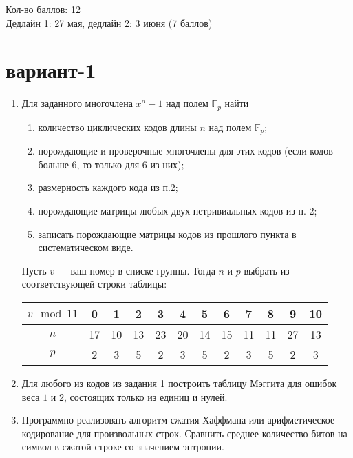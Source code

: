 \documentclass[12pt,letterpaper]{article}
\newcommand{\FF}{\mathds{F}}
\begin{document}
Кол-во баллов: 12\\
Дедлайн 1: 27 мая, дедлайн 2: 3 июня (7 баллов)

\section*{вариант-1}
\begin{enumerate}[\bfseries 1.]
  \item Для заданного многочлена $x^n - 1$ над полем $\FF_p$ найти
  \begin{enumerate}[\it i)]
    \item количество циклических кодов длины $n$ над полем $\FF_p$;
    \item порождающие и проверочные многочлены для этих кодов (если кодов больше 6, то только для 6 из них);
    \item размерность каждого кода из п.2;
    \item порождающие матрицы любых двух нетривиальных кодов из п. 2;
    \item записать порождающие матрицы кодов из прошлого пункта в систематическом виде.
  \end{enumerate}
  Пусть $v$ --- ваш номер в списке группы. Тогда $n$ и $p$ выбрать из соответствующей строки таблицы:
  \begin{center}
    \begin{tabular}{c|ccccccccccc}
      $v \mod 11$ & 0&1&2&3&4&5&6&7&8&9&10 \\ \hline
      $n$ & 17&10&13&23&20&14&15&11&11&27&13 \\  \hline
      $p$ & 2&3&5&2&3&5&2&3&5&2&3  
    \end{tabular}    
  \end{center}
  \item Для любого из кодов из задания 1 построить таблицу Мэггита для ошибок веса $1$ и $2$, состоящих только из единиц и нулей.
  \item Программно реализовать алгоритм сжатия Хаффмана или арифметическое кодирование для произвольных строк. Сравнить среднее количество битов на символ в сжатой строке со значением энтропии.
\end{enumerate}
\end{document}
